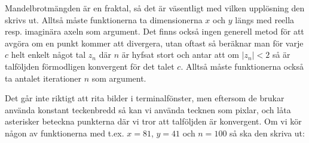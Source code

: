 \documentclass[10pt, twoside,a4paper]{article}
\begin{document}
Mandelbrotmängden är en fraktal, så det är väsentligt med vilken upplösning den skrivs ut. Alltså måste funktionerna ta dimensionerna $x$ och $y$ längs med reella resp. imaginära axeln som argument. Det finns också ingen generell metod för att avgöra om en punkt kommer att divergera, utan oftast så beräknar man för varje $c$ helt enkelt något tal $z_n$ där $n$ är hyfsat stort och antar att om $\left| z_n \right| < 2$ så är talföljden förmodligen konvergent för det talet $c$. Alltså måste funktionerna också ta antalet iterationer $n$ som argument.

Det går inte riktigt att rita bilder i terminalfönster, men eftersom de brukar använda konstant teckenbredd så kan vi använda tecknen som pixlar, och låta asterisker beteckna punkterna där vi tror att talföljden är konvergent. Om vi kör någon av funktionerna med t.ex. $x= 81$, $y = 41$ och $n = 100$ så ska den skriva ut:
\end{document}
